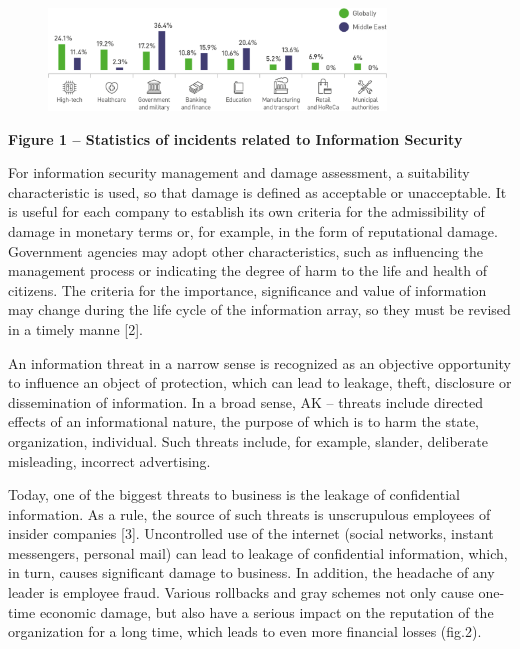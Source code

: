 \begin{figure}[H]
	\centering
	\includegraphics[width=0.8\textwidth]{assets/63}
	\caption*{}
\end{figure}{\bfseries Figure
1 -- Statistics of incidents related to Information Security}

For information security management and damage assessment, a suitability
characteristic is used, so that damage is defined as acceptable or
unacceptable. It is useful for each company to establish its own
criteria for the admissibility of damage in monetary terms or, for
example, in the form of reputational damage. Government agencies may
adopt other characteristics, such as influencing the management process
or indicating the degree of harm to the life and health of citizens. The
criteria for the importance, significance and value of information may
change during the life cycle of the information array, so they must be
revised in a timely manne {[}2{]}.

An information threat in a narrow sense is recognized as an objective
opportunity to influence an object of protection, which can lead to
leakage, theft, disclosure or dissemination of information. In a broad
sense, AK -- threats include directed effects of an informational
nature, the purpose of which is to harm the state, organization,
individual. Such threats include, for example, slander, deliberate
misleading, incorrect advertising.

Today, one of the biggest threats to business is the leakage of
confidential information. As a rule, the source of such threats is
unscrupulous employees of insider companies {[}3{]}. Uncontrolled use of
the internet (social networks, instant messengers, personal mail) can
lead to leakage of confidential information, which, in turn, causes
significant damage to business. In addition, the headache of any leader
is employee fraud. Various rollbacks and gray schemes not only cause
one-time economic damage, but also have a serious impact on the
reputation of the organization for a long time, which leads to even more
financial losses (fig.2).


